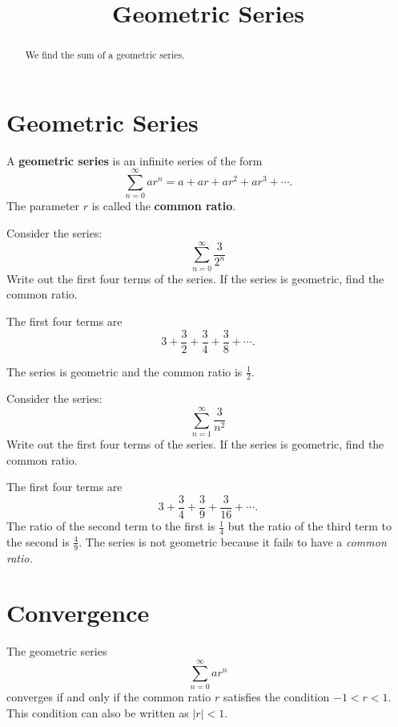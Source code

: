 \documentclass{ximera}
\title{Geometric Series}
\begin{document}
\begin{abstract}
We find the sum of a geometric series.
\end{abstract}

\maketitle

\section{Geometric Series}

\begin{definition} A \textbf{geometric series} is an infinite series of the form
\[
\sum_{n=0}^\infty ar^n = a + ar + ar^2 + ar^3 + \cdots.
\]
The parameter $r$ is called the \textbf{common ratio}.
\end{definition}

\begin{example}
Consider the series:
\[
 \sum_{n=0}^\infty \frac{3}{2^n} 
 \]
 Write out the first four terms of the series. If the series is geometric, find the common ratio.
 
 The first four terms are \[
 3 + \frac32 + \frac34 + \frac38 + \cdots.
 \]

 The series is geometric and the common ratio is $\frac12$.
 \end{example}
 
 \begin{example}
 Consider the series:
\[
 \sum_{n=1}^\infty \frac{3}{n^2} 
 \]
 Write out the first four terms of the series. If the series is geometric, find the common ratio.
 
 The first four terms are 
 \[
 3 + \frac34 + \frac39 + \frac{3}{16} + \cdots.
 \]
 The ratio of the second term to the first is $\frac14$ but the ratio of the third term to the second is $\frac49$.
 The series is not geometric because it fails to have a \it{common} ratio.
 
 \end{example}

\section{Convergence}

\begin{theorem} 
The geometric series
\[
\sum_{n=0}^\infty ar^n
\]
converges if and only if the common ratio $r$ satisfies the condition $-1 < r < 1$.
This condition can also be written as $|r| < 1$.
\end{theorem}
\end{document}
